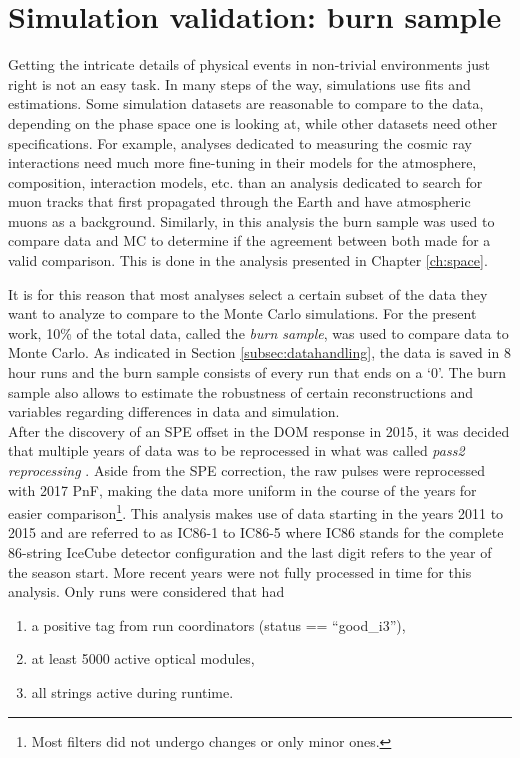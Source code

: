 \section{Simulation validation: burn sample}
\label{sec:burnsample}
Getting the intricate details of physical events in non-trivial environments just right is not an easy task. In many steps of the way, simulations use fits and estimations. Some simulation datasets are reasonable to compare to the data, depending on the phase space one is looking at, while other datasets need other specifications. For example, analyses dedicated to measuring the cosmic ray interactions need much more fine-tuning in their models for the atmosphere, composition, interaction models, etc. than an analysis dedicated to search for muon tracks that first propagated through the Earth and have atmospheric muons as a background. Similarly, in this analysis the burn sample was used to compare data and MC to determine if the agreement between both made for a valid comparison. This is done in the analysis presented in Chapter \ref{ch:space}.

It is for this reason that most analyses select a certain subset of the data they want to analyze to compare to the Monte Carlo simulations. For the present work, 10\% of the total data, called the \textit{burn sample}, was used to compare data to Monte Carlo. As indicated in Section \ref{subsec:datahandling}, the data is saved in 8 hour runs and the burn sample consists of every run that ends on a `0'. The burn sample also allows to estimate the robustness of certain reconstructions and variables regarding differences in data and simulation.\\

\noindent After the discovery of an SPE offset in the DOM response in 2015, it was decided that multiple years of data was to be reprocessed in what was called \textit{pass2 reprocessing} \cite{pass2}. Aside from the SPE correction, the raw pulses were reprocessed with 2017 PnF, making the data more uniform in the course of the years for easier comparison\footnote{Most filters did not undergo changes or only minor ones.}. This analysis makes use of data starting in the years 2011 to 2015 and are referred to as IC86-1 to IC86-5 where IC86 stands for the complete 86-string IceCube detector configuration and the last digit refers to the year of the season start. More recent years were not fully processed in time for this analysis. Only runs were considered that had
\vspace{2mm}
\begin{enumerate}
\item a positive tag from run coordinators (status == ``good\_i3''),
\item at least 5000 active optical modules,
\item all strings active during runtime.
\end{enumerate}
\vspace{2mm}

